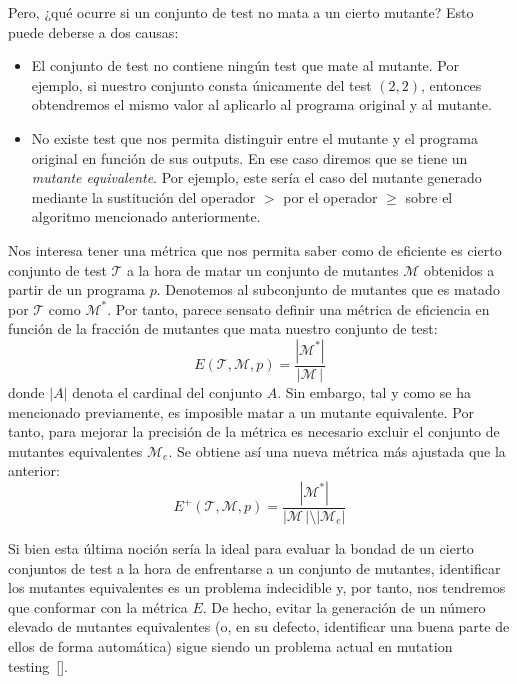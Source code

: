 Pero, ¿qué ocurre si un conjunto de test no mata a un cierto mutante? Esto puede deberse a dos causas:
\begin{itemize}
\item El conjunto de test no contiene ningún test que mate al mutante. Por ejemplo, si nuestro conjunto consta únicamente del test $(2,2)$, entonces obtendremos el mismo valor al aplicarlo al programa original y al mutante.
%
\item No existe test que nos permita distinguir entre el mutante y el programa original en función de sus outputs. En ese caso diremos que se tiene un \emph{mutante equivalente}. Por ejemplo, este sería el caso del mutante generado mediante la sustitución del operador $>$ por el operador $\geq$ sobre el algoritmo mencionado anteriormente.
\end{itemize}

Nos interesa tener una métrica que nos permita saber como de eficiente es cierto conjunto de test $\mathcal{T}$ a la hora de matar un conjunto de mutantes $\mathcal{M}$ obtenidos a partir de un programa $p$. Denotemos al subconjunto de mutantes que es matado por $\mathcal{T}$ como $\mathcal{M}^*$. Por tanto, parece sensato definir una métrica de eficiencia en función de la fracción de mutantes que mata nuestro conjunto de test:
$$E(\mathcal{T},\mathcal{M},p) = \dfrac{|\mathcal{M}^*|}{|\mathcal{M} \,|}$$ donde $|A|$ denota el cardinal del conjunto $A$.
%
Sin embargo, tal y como se ha mencionado previamente, es imposible matar a un mutante equivalente. Por tanto, para mejorar la precisión de la métrica es necesario excluir el conjunto de mutantes equivalentes $\mathcal{M}_e$. Se obtiene así una nueva métrica más ajustada que la anterior:
$$E^+(\mathcal{T},\mathcal{M},p) = \dfrac{|\mathcal{M}^*|}{|\mathcal{M} \,|\setminus|\mathcal{M}_e|}$$

Si bien esta última noción sería la ideal para evaluar la bondad de un cierto conjuntos de test a la hora de enfrentarse a un conjunto de mutantes, identificar los mutantes equivalentes es un problema indecidible y, por tanto, nos tendremos que conformar con la métrica $E$. De hecho, evitar la generación de un número elevado de mutantes equivalentes (o, en su defecto, identificar una buena parte de ellos de forma automática) sigue siendo un problema actual en mutation testing~[\cite{kpjmth18,motj14}].

